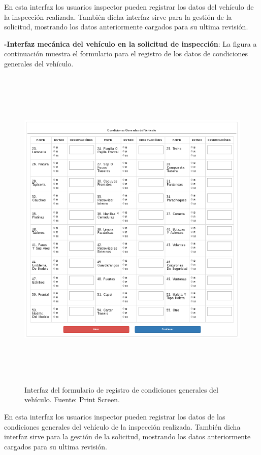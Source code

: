 En esta interfaz los usuarios inspector pueden registrar los datos del vehículo de la inspección realizada. También dicha interfaz sirve para la gestión de la solicitud, mostrando los datos anteriormente cargados para su ultima revisión.

\newpage
\textbf{-Interfaz mecánica del vehículo en la solicitud de inspección}: La figura a continuación muestra el formulario para el registro de los datos de condiciones generales del vehículo.

\begin{figure}[H]
\begin{center}
	\includegraphics[width=\textwidth,height=16cm]{img/interfaces/registro_condiciones_generales_vehiculo.png}
\end{center}
\caption{Interfaz del formulario de registro de condiciones generales del vehículo. Fuente: Print Screen.}
\label{fig:interfaz_registro_condiciones_vehiculo}
\end{figure}

En esta interfaz los usuarios inspector pueden registrar los datos de las condiciones generales del vehículo de la inspección realizada. También dicha interfaz sirve para la gestión de la solicitud, mostrando los datos anteriormente cargados para su ultima revisión.


